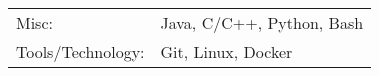\begin{tabular}{ l l }
	Misc:             & Java, C/C++, Python, Bash \\
	Tools/Technology: & Git, Linux, Docker        \\
\end{tabular}
\vspace{2mm}


